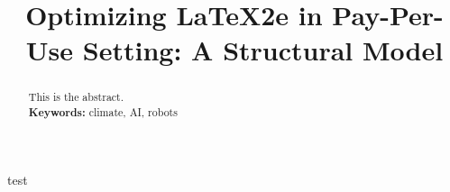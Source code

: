 \documentclass{ssrn}
\title{Optimizing \LaTeX2e in Pay-Per-Use Setting: A Structural Model}
\begin{document}
\maketitle
\begin{abstract}

    This is the abstract.
    \vspace{1em}\\
    \noindent\textbf{Keywords:} climate, AI, robots\\
    \bigskip
\end{abstract}
\newpage
test

\end{document}
